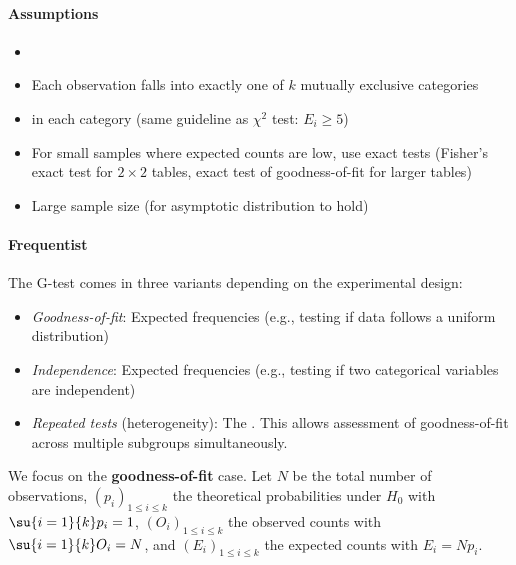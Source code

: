 \paragraph{Assumptions}
\begin{itemize}
    \item {}
    \item Each observation falls into exactly one of $k$ mutually exclusive categories
    \item {} in each category (same guideline as $\chi^2$ test: $E_i \geq 5$)
    \item For small samples where expected counts are low, use exact tests (Fisher's exact test for $2\times2$ tables,
        exact test of goodness-of-fit for larger tables)
    \item Large sample size (for asymptotic distribution to hold)
\end{itemize}

\paragraph{Frequentist}
The G-test comes in three variants depending on the experimental design:
\begin{itemize}
    \item \emph{Goodness-of-fit}: Expected frequencies  (e.g., testing if data follows a uniform distribution)
    \item \emph{Independence}: Expected frequencies  (e.g., testing if two categorical variables are independent)
    \item \emph{Repeated tests} (heterogeneity): The . 
            This allows assessment of goodness-of-fit across multiple subgroups simultaneously.
\end{itemize}

We focus on the \textbf{goodness-of-fit} case. Let $N$ be the total number of observations,
$\left(p_i\right)_{1\leq i\leq k}$ the theoretical probabilities under $H_0$ with $\su{i=1}{k}p_i = 1$,
$\left(O_i\right)_{1\leq i\leq k}$ the observed counts with $\su{i=1}{k}O_i = N$, and
$\left(E_i\right)_{1\leq i\leq k}$ the expected counts with $E_i = Np_i$.

